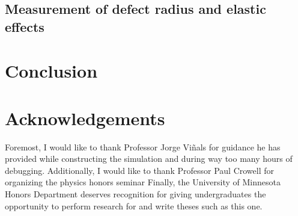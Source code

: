 \documentclass[preprint, aps]{revtex4-1}
\begin{document}
\subsection*{Measurement of defect radius and elastic effects}

\section*{Conclusion}

\section*{Acknowledgements}
Foremost, I would like to thank Professor Jorge Vi\~nals for guidance he has
provided while constructing the simulation and during way too many hours of
debugging. Additionally, I would like to thank Professor Paul Crowell for
organizing the physics honors seminar Finally, the University of Minnesota 
Honors Department deserves recognition for giving undergraduates the opportunity
to perform research for and write theses such as this one.


{}

\end{document}
